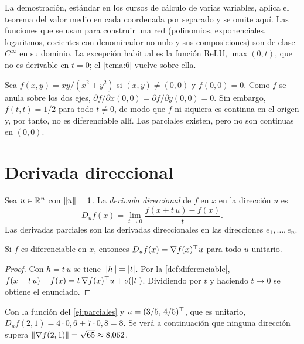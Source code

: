 La demostración, estándar en los cursos de cálculo de varias variables, aplica el teorema del valor medio en cada coordenada por separado y se omite aquí. Las funciones que se usan para construir una red (polinomios, exponenciales, logaritmos, cocientes con denominador no nulo y sus composiciones) son de clase $C^{\infty}$ en su dominio. La excepción habitual es la función ReLU, $\max(0,t)$, que no es derivable en $t=0$; el \cref{tema:6} vuelve sobre ella.

\begin{observacion}
Sea $f(x,y)=xy/(x^{2}+y^{2})$ si $(x,y)\ne(0,0)$ y $f(0,0)=0$. Como $f$ se anula sobre los dos ejes, $\partial f/\partial x(0,0)=\partial f/\partial y(0,0)=0$. Sin embargo, $f(t,t)=1/2$ para todo $t\ne 0$, de modo que $f$ ni siquiera es continua en el origen y, por tanto, no es diferenciable allí. Las parciales existen, pero no son continuas en $(0,0)$.
\end{observacion}

\section{Derivada direccional}

\begin{definicion}\label{def:direccional}
Sea $u\in\mathbb{R}^{n}$ con $\lVert u\rVert=1$. La \emph{derivada direccional} de $f$ en $x$ en la dirección $u$ es
\[
D_u f(x)=\lim_{t\to 0}\frac{f(x+t\,u)-f(x)}{t}.
\]
Las derivadas parciales son las derivadas direccionales en las direcciones $e_1,\dots,e_n$.
\end{definicion}

\begin{proposicion}\label{prop:direccional}
Si $f$ es diferenciable en $x$, entonces $D_u f(x)=\nabla f(x)^{\top} u$ para todo $u$ unitario.
\end{proposicion}

\begin{proof}
Con $h=t\,u$ se tiene $\lVert h\rVert=\lvert t\rvert$. Por la \cref{def:diferenciable}, $f(x+t\,u)-f(x)=t\,\nabla f(x)^{\top} u+o(\lvert t\rvert)$. Dividiendo por $t$ y haciendo $t\to 0$ se obtiene el enunciado.
\end{proof}

\begin{ejemplo}\label{ej:direccional}
Con la función del \cref{ej:parciales} y $u=(3/5,\,4/5)^{\top}$, que es unitario, $D_u f(2,1)=4\cdot 0{,}6+7\cdot 0{,}8=8$. Se verá a continuación que ninguna dirección supera $\lVert\nabla f(2,1)\rVert=\sqrt{65}\approx 8{,}062$.
\end{ejemplo}

